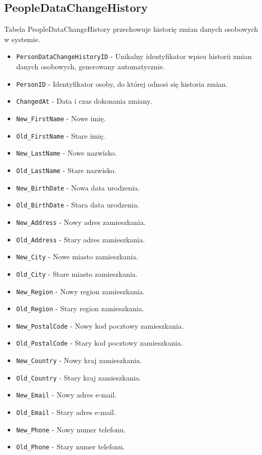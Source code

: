\documentclass[11pt]{article}
\begin{document}
\subsection{PeopleDataChangeHistory}
\label{sec:orgd3e0bed}
Tabela PeopleDataChangeHistory przechowuje historię zmian danych osobowych w systemie.
\begin{itemize}
\item \texttt{PersonDataChangeHistoryID} - Unikalny identyfikator wpisu historii zmian danych osobowych, generowany automatycznie.
\item \texttt{PersonID} - Identyfikator osoby, do której odnosi się historia zmian.
\item \texttt{ChangedAt} - Data i czas dokonania zmiany.
\item \texttt{New\_FirstName} - Nowe imię.
\item \texttt{Old\_FirstName} - Stare imię.
\item \texttt{New\_LastName} - Nowe nazwisko.
\item \texttt{Old\_LastName} - Stare nazwisko.
\item \texttt{New\_BirthDate} - Nowa data urodzenia.
\item \texttt{Old\_BirthDate} - Stara data urodzenia.
\item \texttt{New\_Address} - Nowy adres zamieszkania.
\item \texttt{Old\_Address} - Stary adres zamieszkania.
\item \texttt{New\_City} - Nowe miasto zamieszkania.
\item \texttt{Old\_City} - Stare miasto zamieszkania.
\item \texttt{New\_Region} - Nowy region zamieszkania.
\item \texttt{Old\_Region} - Stary region zamieszkania.
\item \texttt{New\_PostalCode} - Nowy kod pocztowy zamieszkania.
\item \texttt{Old\_PostalCode} - Stary kod pocztowy zamieszkania.
\item \texttt{New\_Country} - Nowy kraj zamieszkania.
\item \texttt{Old\_Country} - Stary kraj zamieszkania.
\item \texttt{New\_Email} - Nowy adres e-mail.
\item \texttt{Old\_Email} - Stary adres e-mail.
\item \texttt{New\_Phone} - Nowy numer telefonu.
\item \texttt{Old\_Phone} - Stary numer telefonu.
\end{itemize}
\end{document}
